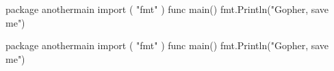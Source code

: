 \documentclass{article}
\begin{document}
\begin{minipage}[t]{.25\textwidth}
    \begin{codebox}
        \begin{gocode}
            package anothermain
            import (
            "fmt"
            )
            func main() {
                fmt.Println("Gopher, save me")
            }
        \end{gocode}
    \end{codebox}
\end{minipage}%
\begin{minipage}[t]{.25\textwidth}
    \begin{codebox}
        \begin{gocode}
            package anothermain
            import (
            "fmt"
            )
            func main() {
                fmt.Println("Gopher, save me")
            }
        \end{gocode}
    \end{codebox}
\end{minipage}%
\end{document}
